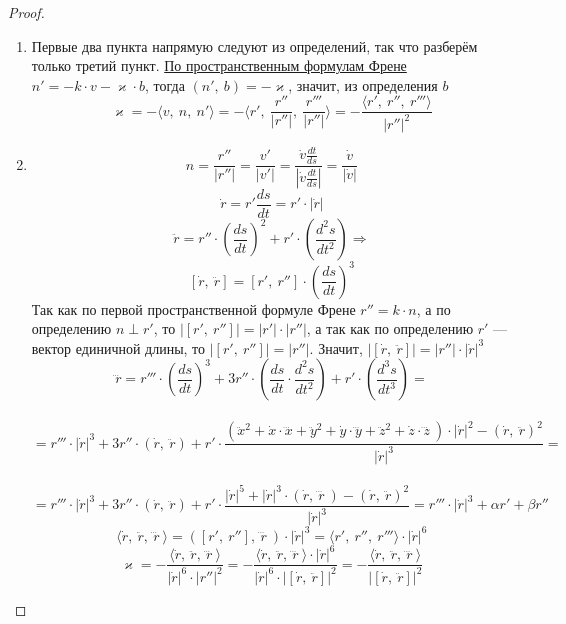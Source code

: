 \documentclass[12pt]{article}
\newcommand\tab[1][.5cm]{\hspace*{#1}}
\theoremstyle{plain}
\begin{document}
    \begin{proof}\tab
        \begin{enumerate}
            \item Первые два пункта напрямую следуют из определений, так что разберём только третий пункт. \hyperlink{4}{По пространственным формулам Френе} $n'=-k\cdot v-\varkappa\cdot b$, тогда $(n', \ b)=-\varkappa$, значит, из определения $b$ $$\varkappa=-\langle v, \ n, \ n'\rangle=-\langle r', \ \frac{r''}{|r''|}, \ \frac{r'''}{|r''|}\rangle=-\frac{\langle r', \ r'', \ r''' \rangle}{|r''|^2}$$
            \item $$n=\frac{r''}{|r''|}=\frac{v'}{|v'|}=\frac{\dot{v}\frac{dt}{ds}}{|\dot{v}\frac{dt}{ds}|}=\frac{\dot{v}}{|\dot{v}|}$$
            $$\dot{r}=r'\frac{ds}{dt}=r'\cdot|\dot{r}|$$
            $$\ddot{r}=r''\cdot\left(\frac{ds}{dt}\right)^2+r'\cdot\left(\frac{d^2s}{dt^2}\right) \Longrightarrow$$$$[\dot{r}, \ \ddot{r}]=[r', \ r'']\cdot\left(\frac{ds}{dt}\right)^3$$
            Так как по первой пространственной формуле Френе $r''=k\cdot n$, а по определению $n\perp r'$, то $|[r', \ r'']|=|r'|\cdot|r''|$, а так как по определению $r'$ --- вектор единичной длины, то $|[r', \ r'']|=|r''|$. Значит, $|[\dot{r}, \ \ddot{r}]|=|r''|\cdot|\dot{r}|^3$
            $$\dddot{r}=r'''\cdot\left(\frac{ds}{dt}\right)^3+3r''\cdot\left(\frac{ds}{dt}\cdot\frac{d^2s}{dt^2}\right)+r'\cdot\left(\frac{d^3s}{dt^3}\right)=$$\\$$=r'''\cdot|\dot{r}|^3+3r''\cdot(\dot{r}, \ \ddot{r})+r'\cdot\frac{(\ddot{x}^2+\dot{x}\cdot\dddot{x}+\ddot{y}^2+\dot{y}\cdot\dddot{y}+\ddot{z}^2+\dot{z}\cdot\dddot{z}\ )\cdot|\dot{r}|^2-(\dot{r}, \ \ddot{r})^2}{|\dot{r}|^3}=$$\\$$=r'''\cdot|\dot{r}|^3+3r''\cdot(\dot{r}, \ \ddot{r})+r'\cdot\frac{|\dot{r}|^5+|\dot{r}|^3\cdot(\dot{r}, \ \dddot{r} \ )-(\dot{r}, \ \ddot{r})^2}{|\dot{r}|^3}=r'''\cdot|\dot{r}|^3+\alpha r'+\beta r''$$
            $$\langle \dot{r}, \ \ddot{r}, \ \dddot{r} \ \rangle=([r', \ r''], \ \dddot{r} \ )\cdot|\dot{r}|^3=\langle r', \ r'', \ r'''\rangle\cdot|\dot{r}|^6$$
            $$\varkappa=-\frac{\langle \dot{r}, \ \ddot{r}, \ \dddot{r} \ \rangle}{|\dot{r}|^6\cdot|r''|^2}=-\frac{\langle \dot{r}, \ \ddot{r}, \ \dddot{r} \ \rangle\cdot |\dot{r}|^6}{|\dot{r}|^6\cdot |[\dot{r}, \ \ddot{r}]|^2}=-\frac{\langle \dot{r}, \ \ddot{r}, \ \dddot{r} \ \rangle}{|[\dot{r}, \ \ddot{r}]|^2}$$
        \end{enumerate}
    \end{proof}
\end{document}
